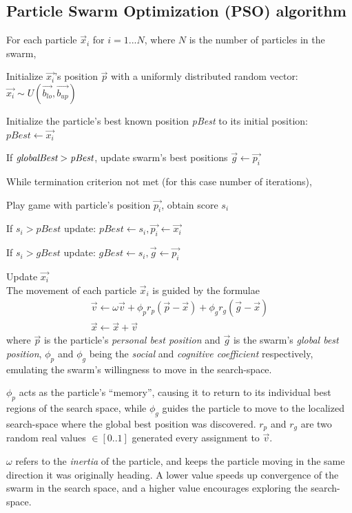 \documentclass[12pt]{article}
\numberwithin{table}{section}
\numberwithin{figure}{section}
\begin{document}
\subsection{Particle Swarm Optimization (PSO) algorithm}\label{app:pso}
For each particle $\vec{x}_i$ for $i=1...N$, where $N$ is the number of particles in the swarm, 

Initialize $\vec{x_i}$'s position $\vec{p}$ with a uniformly distributed random vector: $\vec{x_i} \sim U(\vec{b_{lo}}, \vec{b_{up}})$

Initialize the particle's best known position \emph{pBest} to its initial position: $pBest \leftarrow \vec{x_i}$

If $\emph{globalBest} > \emph{pBest}$, update swarm's best positions $\vec{g} \leftarrow \vec{p_i}$

\noindent While termination criterion not met (for this case number of iterations),

Play game with particle's position $\vec{p_i}$, obtain score $s_i$

If $s_i > pBest$ update: $pBest \leftarrow s_i, \vec{p_i} \leftarrow \vec{x_i}$

If $s_i > gBest$ update: $gBest \leftarrow s_i, \vec{g} \leftarrow \vec{p_i}$

Update $\vec{x_i}$\\

\noindent The movement of each particle $\vec{x}_i$ is guided by the formulae
\begin{gather*}
\vec{v}\leftarrow \omega\vec{v} + \phi_p r_p ( \vec{p} - \vec{x} ) + \phi_g r_g ( \vec{g} - \vec{x} )
\\
\vec{x}\leftarrow \vec{x} + \vec{v}
\end{gather*}
where $\vec{p}$ is the particle's \emph{personal best position} and $\vec{g}$ is the swarm's \emph{global best position}, $\phi_p$ and $\phi_g$ being the \emph{social} and \emph{cognitive coefficient} respectively, emulating the swarm's willingness to move in the search-space. 

$\phi_p$ acts as the particle's ``memory'', causing it to return to its individual best regions of the search space, while $\phi_g$ guides the particle to move to the localized search-space where the global best position was discovered. $r_p$ and $r_g$ are two random real values $\in\left[0..1\right]$ generated every assignment to $\vec{v}$. 

$\omega$ refers to the \emph{inertia} of the particle, and keeps the particle moving in the same direction it was originally heading. A lower value speeds up convergence of the swarm in the search space, and a higher value encourages exploring the search-space.
\end{document}
